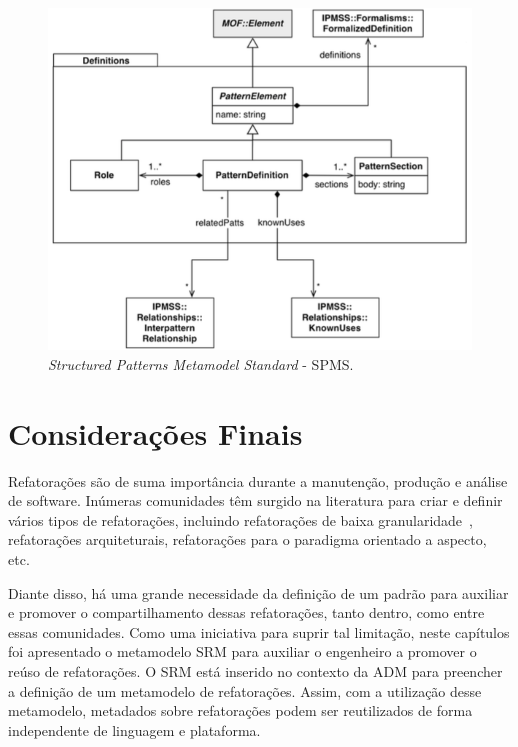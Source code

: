 \begin{figure}[h]
	\centering
	\caption{\textit{Structured Patterns Metamodel Standard} - SPMS.}
	\label{fig:SPMS_metamodel_related}
	\includegraphics[scale=0.57]{images/SPMS_related}
\end{figure}



\section{Considerações Finais}
\label{sec:consideracoes_finais_SRM}

Refatorações são de suma importância durante a manutenção, produção e análise de software. Inúmeras comunidades têm surgido na literatura para criar e definir vários tipos de refatorações, incluindo refatorações de baixa granularidade~\cite{Fowler1999, Demeyer1, Demeyer2}, refatorações arquiteturais, refatorações para o paradigma orientado a aspecto, etc. 

Diante disso, há uma grande necessidade da definição de um padrão para auxiliar e promover o compartilhamento dessas refatorações, tanto dentro, como entre essas comunidades. Como uma iniciativa para suprir tal limitação, neste capítulos foi apresentado o metamodelo SRM para auxiliar o engenheiro a promover o reúso de refatorações. O SRM está inserido no contexto da ADM para preencher a definição de um metamodelo de refatorações. Assim, com a utilização desse metamodelo, metadados sobre refatorações podem ser reutilizados de forma independente de linguagem e plataforma.

